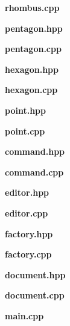 \documentclass[a4paper, 12pt]{article}
\begin{document}
\vspace{3ex}
\textbf{\large{rhombus.cpp}}


\vspace{3ex}
\textbf{\large{pentagon.hpp}}


\vspace{3ex}
\textbf{\large{pentagon.cpp}}


\vspace{3ex}
\textbf{\large{hexagon.hpp}}


\vspace{3ex}
\textbf{\large{hexagon.cpp}}


\vspace{3ex}
\textbf{\large{point.hpp}}


\vspace{3ex}
\textbf{\large{point.cpp}}


\vspace{3ex}
\textbf{\large{command.hpp}}


\vspace{3ex}
\textbf{\large{command.cpp}}


\vspace{3ex}
\textbf{\large{editor.hpp}}


\vspace{3ex}
\textbf{\large{editor.cpp}}


\vspace{3ex}
\textbf{\large{factory.hpp}}


\vspace{3ex}
\textbf{\large{factory.cpp}}


\vspace{3ex}
\textbf{\large{document.hpp}}


\vspace{3ex}
\textbf{\large{document.cpp}}


\vspace{3ex}
\textbf{\large{main.cpp}}

\end{document}
